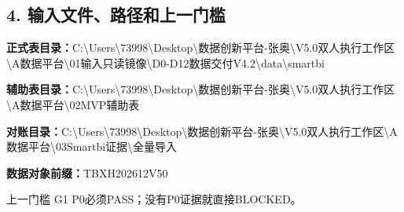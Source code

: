 \documentclass[UTF8,openany,zihao=-4]{ctexbook}
\renewcommand{\_}{\textunderscore\allowbreak}
\begin{document}
\subsection*{4. 输入文件、路径和上一门槛}
\noindent\textbf{正式表目录：}{\promptlatin\promptcjk\small C:\textbackslash{}\allowbreak{}Users\textbackslash{}\allowbreak{}73998\textbackslash{}\allowbreak{}Desktop\textbackslash{}\allowbreak{}数据创新平台-\allowbreak{}张奥\textbackslash{}\allowbreak{}V5.0\_\allowbreak{}双人执行工作区\textbackslash{}\allowbreak{}A\_\allowbreak{}数据平台\textbackslash{}\allowbreak{}01\_\allowbreak{}输入只读镜像\textbackslash{}\allowbreak{}D0-\allowbreak{}D12\_\allowbreak{}数据交付\_\allowbreak{}V4.2\textbackslash{}\allowbreak{}data\textbackslash{}\allowbreak{}smartbi}\par
\noindent\textbf{辅助表目录：}{\promptlatin\promptcjk\small C:\textbackslash{}\allowbreak{}Users\textbackslash{}\allowbreak{}73998\textbackslash{}\allowbreak{}Desktop\textbackslash{}\allowbreak{}数据创新平台-\allowbreak{}张奥\textbackslash{}\allowbreak{}V5.0\_\allowbreak{}双人执行工作区\textbackslash{}\allowbreak{}A\_\allowbreak{}数据平台\textbackslash{}\allowbreak{}02\_\allowbreak{}MVP辅助表}\par
\noindent\textbf{对账目录：}{\promptlatin\promptcjk\small C:\textbackslash{}\allowbreak{}Users\textbackslash{}\allowbreak{}73998\textbackslash{}\allowbreak{}Desktop\textbackslash{}\allowbreak{}数据创新平台-\allowbreak{}张奥\textbackslash{}\allowbreak{}V5.0\_\allowbreak{}双人执行工作区\textbackslash{}\allowbreak{}A\_\allowbreak{}数据平台\textbackslash{}\allowbreak{}03\_\allowbreak{}Smartbi证据\textbackslash{}\allowbreak{}全量导入}\par
\noindent\textbf{数据对象前缀：}{\promptlatin\promptcjk\small TB\_\allowbreak{}XH202612\_\allowbreak{}V50\_\allowbreak{}}\par
\begin{gatebox}{上一门槛}
G1 P0必须PASS；没有P0证据就直接BLOCKED。

\end{gatebox}
\end{document}
